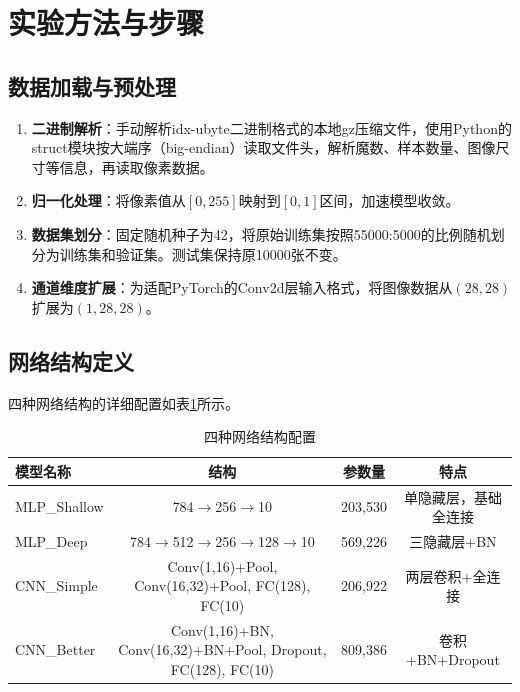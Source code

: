 \documentclass[12pt,a4paper]{ctexart}
\begin{document}
\section{实验方法与步骤}

\subsection{数据加载与预处理}
\begin{enumerate}
  \item \textbf{二进制解析}：手动解析idx-ubyte二进制格式的本地gz压缩文件，使用Python的struct模块按大端序（big-endian）读取文件头，解析魔数、样本数量、图像尺寸等信息，再读取像素数据。
  \item \textbf{归一化处理}：将像素值从$[0,255]$映射到$[0,1]$区间，加速模型收敛。
  \item \textbf{数据集划分}：固定随机种子为42，将原始训练集按照55000:5000的比例随机划分为训练集和验证集。测试集保持原10000张不变。
  \item \textbf{通道维度扩展}：为适配PyTorch的Conv2d层输入格式，将图像数据从$(28,28)$扩展为$(1,28,28)$。
\end{enumerate}

\subsection{网络结构定义}
四种网络结构的详细配置如表\ref{tab:architectures}所示。

\begin{table}[H]
\centering
\caption{四种网络结构配置}
\label{tab:architectures}
\vspace{0.2cm}
\begin{tabular}{lccc}
\toprule
\textbf{模型名称} & \textbf{结构} & \textbf{参数量} & \textbf{特点} \\
\midrule
MLP\_Shallow & 784$\rightarrow$256$\rightarrow$10 & 203,530 & 单隐藏层，基础全连接 \\
MLP\_Deep & 784$\rightarrow$512$\rightarrow$256$\rightarrow$128$\rightarrow$10 & 569,226 & 三隐藏层+BN \\
CNN\_Simple & Conv(1,16)+Pool, Conv(16,32)+Pool, FC(128), FC(10) & 206,922 & 两层卷积+全连接 \\
CNN\_Better & Conv(1,16)+BN, Conv(16,32)+BN+Pool, Dropout, FC(128), FC(10) & 809,386 & 卷积+BN+Dropout \\
\bottomrule
\end{tabular}
\end{table}
\end{document}
